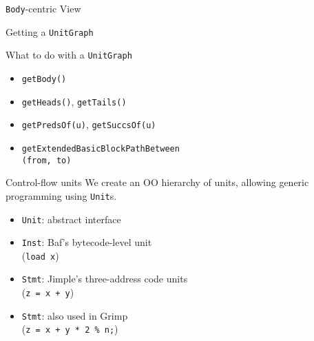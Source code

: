 \begin{slide}{{\tt Body}-centric View}
\begin{center}

\end{center}
\end{slide}

\begin{slide}{Getting a {\tt UnitGraph}}
\begin{center}

\end{center}
\end{slide}

\begin{slide}{What to do with a {\tt UnitGraph}}
\begin{itemize}
\item {\tt getBody()}
\item {\tt getHeads()}, {\tt getTails()}
\item {\tt getPredsOf(u)}, {\tt getSuccsOf(u)}
\item {\tt getExtendedBasicBlockPathBetween\\
                (from, to)}
\end{itemize}
\end{slide}

\begin{slide}{Control-flow units}
We create an OO hierarchy of units, allowing generic programming using
{\tt Unit}s.

\begin{itemize}
\item {\tt Unit}: abstract interface

\item {\tt Inst}: Baf's bytecode-level unit\\
\qquad \qquad ({\tt load x})

\item {\tt Stmt}: Jimple's three-address code units\\
\qquad \qquad ({\tt z = x + y})

\item {\tt Stmt}: also used in Grimp\\
\qquad \qquad ({\tt z = x + y * 2 \% n;})
\end{itemize}
\end{slide}

